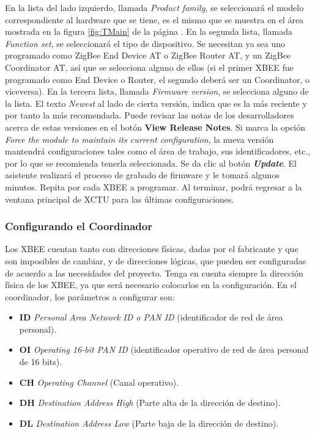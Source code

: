 En la lista del lado izquierdo, llamada \textit{Product family}, se seleccionará el modelo correspondiente al hardware que se tiene, es el mismo que se muestra en el área mostrada en la figura \ref{fig:TMain} de la página \pageref{fig:TMain}. En la segunda lista, llamada \textit{Function set}, se seleccionará el tipo de dispositivo. Se necesitan ya sea uno programado como ZigBee End Device AT o ZigBee Router AT, y un ZigBee Coordinator AT, así que se selecciona alguno de ellos (si el primer XBEE fue programado como End Device o Router, el segundo deberá ser un Coordinator, o viceversa). En la tercera lista, llamada \textit{Firmware version}, se selecciona alguno de la lista. El texto \textit{Newest} al lado de cierta versión, indica que es la más reciente y por tanto la más recomendada. Puede revisar las notas de los desarrolladores acerca de estas versiones en el botón \textbf{View Release Notes}. Si marca la opción \textit{Force the module to maintain its current configuration}, la nueva versión mantendrá configuraciones tales como el área de trabajo, sus identificadores, etc., por lo que se recomienda tenerla seleccionada. Se da clic al botón \textit{\textbf{Update}}. El asistente realizará el proceso de grabado de firmware y le tomará algunos minutos. Repita por cada XBEE a programar. Al terminar, podrá regresar a la ventana principal de XCTU para las últimas configuraciones.

\subsubsection{Configurando el Coordinador}
Los XBEE cuentan tanto con direcciones físicas, dadas por el fabricante y que son imposibles de cambiar, y de direcciones lógicas, que pueden ser configuradas de acuerdo a las necesidades del proyecto. Tenga en cuenta siempre la dirección física de los XBEE, ya que será necesario colocarlos en la configuración. En el coordinador, los parámetros a configurar son:

\begin{itemize}
	\item \textbf{ID} \textit{Personal Area Network ID o PAN ID} (identificador de red de área personal). 
	\item \textbf{OI} \textit{Operating 16-bit PAN ID} (identificador operativo de red de área personal de 16 bits).
	\item \textbf{CH} \textit{Operating Channel} (Canal operativo).
	\item \textbf{DH} \textit{Destination Address High} (Parte alta de la dirección de destino).
	\item \textbf{DL} \textit{Destination Address Low} (Parte baja de la dirección de destino).
\end{itemize}

